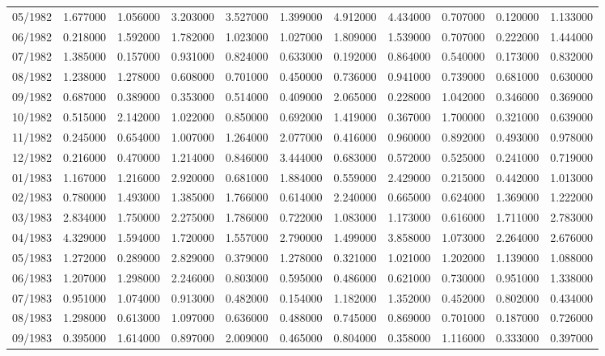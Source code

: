 \begin{tabular}{lrrrrrrrrrr}
05/1982 & 1.677000 & 1.056000 & 3.203000 & 3.527000 & 1.399000 & 4.912000 & 4.434000 & 0.707000 & 0.120000 & 1.133000 \\
06/1982 & 0.218000 & 1.592000 & 1.782000 & 1.023000 & 1.027000 & 1.809000 & 1.539000 & 0.707000 & 0.222000 & 1.444000 \\
07/1982 & 1.385000 & 0.157000 & 0.931000 & 0.824000 & 0.633000 & 0.192000 & 0.864000 & 0.540000 & 0.173000 & 0.832000 \\
08/1982 & 1.238000 & 1.278000 & 0.608000 & 0.701000 & 0.450000 & 0.736000 & 0.941000 & 0.739000 & 0.681000 & 0.630000 \\
09/1982 & 0.687000 & 0.389000 & 0.353000 & 0.514000 & 0.409000 & 2.065000 & 0.228000 & 1.042000 & 0.346000 & 0.369000 \\
10/1982 & 0.515000 & 2.142000 & 1.022000 & 0.850000 & 0.692000 & 1.419000 & 0.367000 & 1.700000 & 0.321000 & 0.639000 \\
11/1982 & 0.245000 & 0.654000 & 1.007000 & 1.264000 & 2.077000 & 0.416000 & 0.960000 & 0.892000 & 0.493000 & 0.978000 \\
12/1982 & 0.216000 & 0.470000 & 1.214000 & 0.846000 & 3.444000 & 0.683000 & 0.572000 & 0.525000 & 0.241000 & 0.719000 \\
01/1983 & 1.167000 & 1.216000 & 2.920000 & 0.681000 & 1.884000 & 0.559000 & 2.429000 & 0.215000 & 0.442000 & 1.013000 \\
02/1983 & 0.780000 & 1.493000 & 1.385000 & 1.766000 & 0.614000 & 2.240000 & 0.665000 & 0.624000 & 1.369000 & 1.222000 \\
03/1983 & 2.834000 & 1.750000 & 2.275000 & 1.786000 & 0.722000 & 1.083000 & 1.173000 & 0.616000 & 1.711000 & 2.783000 \\
04/1983 & 4.329000 & 1.594000 & 1.720000 & 1.557000 & 2.790000 & 1.499000 & 3.858000 & 1.073000 & 2.264000 & 2.676000 \\
05/1983 & 1.272000 & 0.289000 & 2.829000 & 0.379000 & 1.278000 & 0.321000 & 1.021000 & 1.202000 & 1.139000 & 1.088000 \\
06/1983 & 1.207000 & 1.298000 & 2.246000 & 0.803000 & 0.595000 & 0.486000 & 0.621000 & 0.730000 & 0.951000 & 1.338000 \\
07/1983 & 0.951000 & 1.074000 & 0.913000 & 0.482000 & 0.154000 & 1.182000 & 1.352000 & 0.452000 & 0.802000 & 0.434000 \\
08/1983 & 1.298000 & 0.613000 & 1.097000 & 0.636000 & 0.488000 & 0.745000 & 0.869000 & 0.701000 & 0.187000 & 0.726000 \\
09/1983 & 0.395000 & 1.614000 & 0.897000 & 2.009000 & 0.465000 & 0.804000 & 0.358000 & 1.116000 & 0.333000 & 0.397000 \\

\end{tabular}
